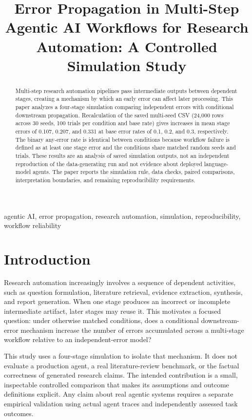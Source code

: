 \documentclass[conference]{IEEEtran}
\title{Error Propagation in Multi-Step Agentic AI Workflows for Research Automation: A Controlled Simulation Study}
\author{\IEEEauthorblockN{[AUTHOR NAME]}
\IEEEauthorblockA{[DEPARTMENT / INSTITUTION]\\ \texttt{[EMAIL OR STUDENT ID, IF REQUIRED]}}}
\begin{document}
\maketitle

\begin{abstract}
Multi-step research automation pipelines pass intermediate outputs between dependent stages, creating a mechanism by which an early error can affect later processing. This paper analyzes a four-stage simulation comparing independent errors with conditional downstream propagation. Recalculation of the saved multi-seed CSV (24,000 rows across 30 seeds, 100 trials per condition and base rate) gives increases in mean stage errors of 0.107, 0.207, and 0.331 at base error rates of 0.1, 0.2, and 0.3, respectively. The binary any-error rate is identical between conditions because workflow failure is defined as at least one stage error and the conditions share matched random seeds and trials. These results are an analysis of saved simulation outputs, not an independent reproduction of the data-generating run and not evidence about deployed language-model agents. The paper reports the simulation rule, data checks, paired comparisons, interpretation boundaries, and remaining reproducibility requirements.
\end{abstract}

\begin{IEEEkeywords}
agentic AI, error propagation, research automation, simulation, reproducibility, workflow reliability
\end{IEEEkeywords}

\section{Introduction}
Research automation increasingly involves a sequence of dependent activities, such as question formulation, literature retrieval, evidence extraction, synthesis, and report generation. When one stage produces an incorrect or incomplete intermediate artifact, later stages may reuse it. This motivates a focused question: under otherwise matched conditions, does a conditional downstream-error mechanism increase the number of errors accumulated across a multi-stage workflow relative to an independent-error model?

This study uses a four-stage simulation to isolate that mechanism. It does not evaluate a production agent, a real literature-review benchmark, or the factual correctness of generated research claims. The intended contribution is a small, inspectable controlled comparison that makes its assumptions and outcome definitions explicit. Any claim about real agentic systems requires a separate empirical validation using actual agent traces and independently assessed task outcomes.
\end{document}
